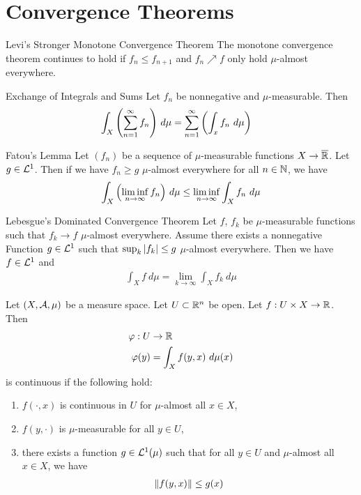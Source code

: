 \section{Convergence Theorems}
\begin{importanttheorem}{Levi's Stronger Monotone Convergence Theorem}{}
	The monotone convergence theorem continues to hold if $f_n \leq f_{n+1}$ and $f_n \nearrow f$ only hold $\mu$-almost everywhere.
\end{importanttheorem}
\begin{importantcorollary}{Exchange of Integrals and Sums}{}
	Let $f_n$ be nonnegative and $\mu$-measurable. Then
	\begin{align*}
		\int_X \qty(\sum_{n = 1}^\infty f_n) ~d\mu
		&=
		\sum_{n = 1}^\infty \qty(\int_x f_n ~d\mu)
	\end{align*}
\end{importantcorollary}
\begin{importanttheorem}{Fatou's Lemma}{}
	Let $(f_n)$ be a sequence of $\mu$-measurable functions $X \to \overline{{\mathbb{R}}}$. Let $g \in \mathcal{L}^1$. Then if we have $f_n \geq g$ $\mu$-almost everywhere for all $n \in \mathbb{N}$, we have
	\begin{align*}
		\int_X \qty(\liminf_{n \to \infty} f_n) ~d\mu
		\leq
		\liminf_{n \to \infty} \int_X f_n ~d\mu
	\end{align*}
\end{importanttheorem}
\begin{importanttheorem}{Lebesgue's Dominated Convergence Theorem}{}
	Let $f$, $f_k$ be $\mu$-measurable functions such that $f_k \to f$ $\mu$-almost everywhere. Assume there exists a nonnegative Function $g \in \mathcal{L}^1$ such that $\sup_k \abs{f_k} \leq g$ $\mu$-almost everywhere. Then we have $f \in \mathcal{L}^1$ and
	\begin{align*}
		\int_X f ~d\mu = \lim_{k \to \infty} \int_X f_k ~d\mu
	\end{align*}
\end{importanttheorem}
\begin{lemma}
	Let $(X, \mathcal{A}, \mu)$ be a measure space. Let $U \subset \mathbb{R}^n$ be open. Let $f : U \times X \to \mathbb{R}$. Then
	\begin{align*}
		\varphi : U &\to \mathbb{R}\\
		\varphi(y) &= \int_X f(y,x) ~d\mu(x)
	\end{align*}
	is continuous if the following hold:
	\begin{enumerate}
		\item $f(\cdot,x)$ is continuous in $U$ for $\mu$-almost all $x \in X$,
		\item $f(y, \cdot)$ is $\mu$-measurable for all $y \in U$,
		\item there exists a function $g \in \mathcal{L}^1(\mu)$ such that for all $y \in U$ and $\mu$-almost all $x \in X$, we have
		\begin{align*}
			\norm{f(y,x)} \leq g(x)
		\end{align*}
	\end{enumerate}
\end{lemma}
